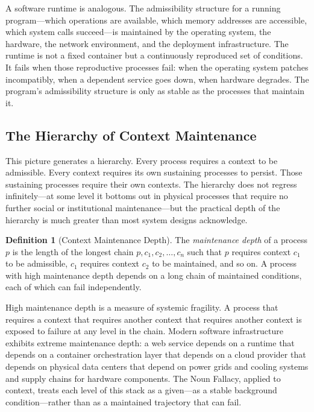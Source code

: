 \documentclass[12pt, a4paper]{article}
\theoremstyle{plain}
\theoremstyle{definition}
\newtheorem{definition}[theorem]{Definition}
\theoremstyle{remark}
\begin{document}
A software runtime is analogous. The admissibility structure for a running
program---which operations are available, which memory addresses are accessible,
which system calls succeed---is maintained by the operating system, the hardware,
the network environment, and the deployment infrastructure. The runtime is not
a fixed container but a continuously reproduced set of conditions. It fails
when those reproductive processes fail: when the operating system patches
incompatibly, when a dependent service goes down, when hardware degrades.
The program's admissibility structure is only as stable as the processes
that maintain it.

\subsection{The Hierarchy of Context Maintenance}

This picture generates a hierarchy. Every process requires a context to be
admissible. Every context requires its own sustaining processes to persist.
Those sustaining processes require their own contexts. The hierarchy does not
regress infinitely---at some level it bottoms out in physical processes that
require no further social or institutional maintenance---but the practical
depth of the hierarchy is much greater than most system designs acknowledge.

\begin{definition}[Context Maintenance Depth]
The \emph{maintenance depth} of a process $p$ is the length of the longest
chain $p, c_1, c_2, \ldots, c_n$ such that $p$ requires context $c_1$ to
be admissible, $c_1$ requires context $c_2$ to be maintained, and so on.
A process with high maintenance depth depends on a long chain of maintained
conditions, each of which can fail independently.
\end{definition}

High maintenance depth is a measure of systemic fragility. A process that
requires a context that requires another context that requires another context
is exposed to failure at any level in the chain. Modern software infrastructure
exhibits extreme maintenance depth: a web service depends on a runtime that
depends on a container orchestration layer that depends on a cloud provider
that depends on physical data centers that depend on power grids and
cooling systems and supply chains for hardware components. The Noun Fallacy,
applied to context, treats each level of this stack as a given---as a stable
background condition---rather than as a maintained trajectory that can fail.
\end{document}
